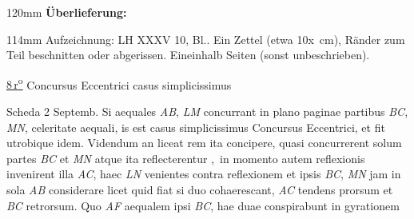 %
\frenchspacing%
\begin{ledgroupsized}[r]{120mm}%
\footnotesize%
\pstart%
\noindent\textbf{Überlieferung:}
\pend%
\end{ledgroupsized}%
\begin{ledgroupsized}[r]{114mm}%
\footnotesize%
\pstart%
\parindent -6mm%
%
Aufzeichnung:
LH XXXV 10, Bl..
Ein Zettel (etwa 10\;x~cm),
Ränder zum Teil beschnitten oder abgerissen.
Eineinhalb Seiten (sonst unbeschrieben).
\pend%
\end{ledgroupsized}%
%
\frenchspacing%
\vspace{8mm}%
\normalsize%
\pstart%
\noindent%
\lbrack%
\href{\Scan{LH_35_10_13_008r}}%
{8\,r\textsuperscript{o}}%
\rbrack%
\hfill%
Concursus Eccentrici%
casus simplicissimus%
\hfill%
%
\par%
\centering%
Scheda 2%
\quad%
%
Septemb.%
\pend%
\vspace{1.0em}
\pstart%
\noindent%
Si aequales
\textit{AB}, \textit{LM}
concurrant in plano paginae%
%
partibus \textit{BC}, \textit{MN},
celeritate aequali,%
is est casus simplicissimus%
Concursus Eccentrici,%
et fit utrobique idem.
Videndum an liceat rem ita concipere,
quasi concurrerent solum partes
\textit{BC} %
et \textit{MN} %
atque ita reflecterentur%
\lbrack,\rbrack\
in momento autem reflexionis%
%
invenirent illa \textit{AC}, haec \textit{LN}
venientes contra reflexionem%
et ipsis \textit{BC}, \textit{MN}
jam in sola \textit{AB} considerare licet %
quid fiat
si duo cohaerescant,
\textit{AC} tendens prorsum
et \textit{BC} retrorsum.
Quo
\textit{AF} aequalem ipsi \textit{BC},
hae duae conspirabunt in gyrationem%
